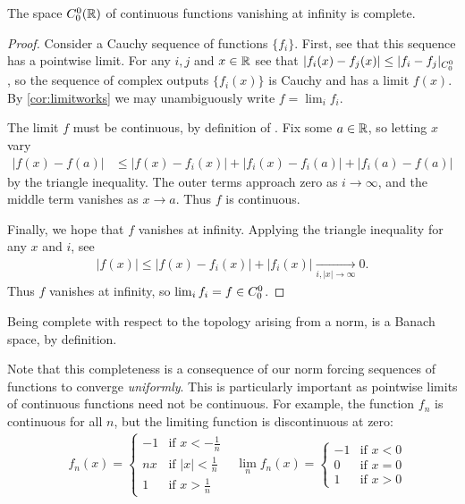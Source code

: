       \begin{thm}
        \label{thm:c00complete}
        The space ${C^0_0}(\mathbb{R})$ of continuous functions vanishing at infinity is complete.
      \end{thm}
      \begin{proof}
        Consider a Cauchy sequence of \Coo functions $\{f_i\}$.
        First, see that this sequence has a pointwise limit.
        For any $i,j$ and $x\in\mathbb{R}$ see that $|f_i(x)-f_j(x)| \le |f_i-f_j|_{C^0_0}$, so the sequence of complex outputs $\{f_i(x)\}$ is Cauchy and has a limit $f(x)$.
        By \cref{cor:limitworks} we may unambiguously write $f=\lim_i f_i$.

        The limit $f$ must be continuous, by definition of \Coo.
        Fix some $a\in\mathbb{R}$, so letting $x$ vary
        \begin{align*}
          |f(x)-f(a)|
          &\le |f(x)-f_i(x)|+|f_i(x)-f_i(a)|+|f_i(a)-f(a)|
        \end{align*}
        by the triangle inequality.
        The outer terms approach zero as $i\rightarrow\infty$, and the middle term vanishes as $x\rightarrow a$.
        Thus $f$ is continuous.

        Finally, we hope that $f$ vanishes at infinity.
        Applying the triangle inequality for any $x$ and $i$, see
        \begin{align*}
          |f(x)| \le |f(x)-f_i(x)| + |f_i(x)|
          \underset{i, |x|\rightarrow\infty}{\longrightarrow} 0\text{.}
        \end{align*}
        Thus $f$ vanishes at infinity, so $\lim_i f_i = f\in{C^0_0}$.
      \end{proof}
      \begin{cor}
        Being complete with respect to the topology arising from a norm, \Coo is a Banach space, by definition.
      \end{cor}
      \begin{rmk}
        Note that this completeness is a consequence of our norm forcing sequences of functions to converge \emph{uniformly}.
        This is particularly important as pointwise limits of continuous functions need not be continuous.
        For example, the function $f_n$ is continuous for all $n$, but the limiting function is discontinuous at zero:
        \begin{align*}
          &f_n(x)=
          \begin{cases}
            -1 &\text{if } x<-\frac1n\\
            nx &\text{if } |x|<\frac1n\\
            1 &\text{if } x>\frac1n
          \end{cases}
          &\lim_nf_n(x)=
          \begin{cases}
            -1 &\text{if } x<0\\
            0 &\text{if } x=0\\
            1 &\text{if } x>0
          \end{cases}
        \end{align*}
      \end{rmk}

